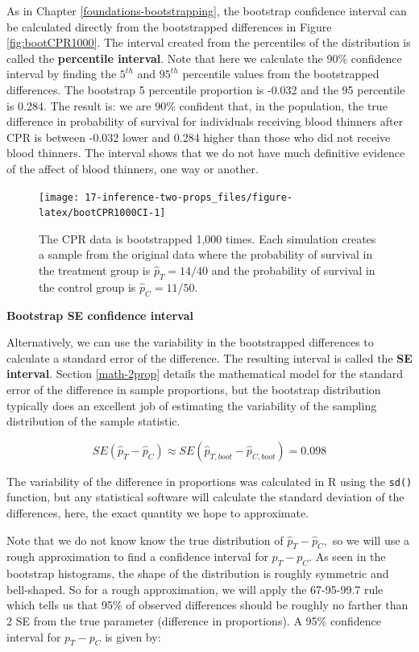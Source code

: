 \documentclass[
  10pt,
  openany]{book}
\begin{document}
As in Chapter \ref{foundations-bootstrapping}, the bootstrap confidence interval can be calculated directly from the bootstrapped differences in Figure \ref{fig:bootCPR1000}.
The interval created from the percentiles of the distribution is called the \textbf{percentile interval}.
Note that here we calculate the 90\% confidence interval by finding the \(5^{th}\) and \(95^{th}\) percentile values from the bootstrapped differences.
The bootstrap 5 percentile proportion is -0.032 and the 95 percentile is 0.284.
The result is: we are 90\% confident that, in the population, the true difference in probability of survival for individuals receiving blood thinners after CPR is between -0.032 lower and 0.284 higher than those who did not receive blood thinners.
The interval shows that we do not have much definitive evidence of the affect of blood thinners, one way or another.

\begin{figure}[h]

{\centering \texttt{[image: 17-inference-two-props\_files/figure-latex/bootCPR1000CI-1]} 

}

\caption{The CPR data is bootstrapped 1,000 times. Each simulation creates a sample from the original data where the probability of survival in the treatment group is $\hat{p}_{T}  = 14/40$ and the probability of survival in the control group is $\hat{p}_{C} = 11/50.$ }\label{fig:bootCPR1000CI}
\end{figure}

\textbf{Bootstrap SE confidence interval}

Alternatively, we can use the variability in the bootstrapped differences to calculate a standard error of the difference.
The resulting interval is called the \textbf{SE interval}.
Section \ref{math-2prop} details the mathematical model for the standard error of the difference in sample proportions, but the bootstrap distribution typically does an excellent job of estimating the variability of the sampling distribution of the sample statistic.

\[SE(\hat{p}_T - \hat{p}_C) \approx SE(\hat{p}_{T, boot} - \hat{p}_{C, boot}) = 0.098\]

The variability of the difference in proportions was calculated in R using the \texttt{sd()} function, but any statistical software will calculate the standard deviation of the differences, here, the exact quantity we hope to approximate.

Note that we do not know know the true distribution of \(\hat{p}_T - \hat{p}_C,\) so we will use a rough approximation to find a confidence interval for \(p_T - p_C.\) As seen in the bootstrap histograms, the shape of the distribution is roughly symmetric and bell-shaped.
So for a rough approximation, we will apply the 67-95-99.7 rule which tells us that 95\% of observed differences should be roughly no farther than 2 SE from the true parameter (difference in proportions).
A 95\% confidence interval for \(p_T - p_C\) is given by:
\end{document}
